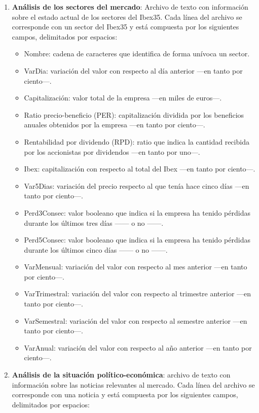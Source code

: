 \documentclass[a4paper, 11pt, titlepage]{article}
\begin{document}
\begin{enumerate}
        \item \textbf{Análisis de los sectores del mercado}: Archivo de texto con información sobre el estado actual de los sectores del Ibex35. Cada línea del archivo se corresponde con un sector del Ibex35 y está compuesta por los siguientes campos, delimitados por espacios:
        \begin{itemize}
            \item Nombre: cadena de caracteres que identifica de forma unívoca un sector.
            \item VarDia: variación del valor con respecto al día anterior ---en tanto por ciento---.
            \item Capitalización: valor total de la empresa ---en miles de euros---.
            \item Ratio precio-beneficio (PER): capitalización dividida por los beneficios anuales obtenidos por la empresa ---en tanto por ciento---.
            \item Rentabilidad por dividendo (RPD): ratio que indica la cantidad recibida por los accionistas por dividendos ---en tanto por uno---.
            \item Ibex: capitalización con respecto al total del Ibex ---en tanto por ciento---.
            \item Var5Dias: variación del precio respecto al que tenía hace cinco días ---en tanto por ciento---.
            \item Perd3Consec: valor booleano que indica si la empresa ha tenido pérdidas durante los últimos tres días ------ o no ------.
            \item Perd5Consec: valor booleano que indica si la empresa ha tenido pérdidas durante los últimos cinco días ------ o no ------.
            \item VarMensual: variación del valor con respecto al mes anterior ---en tanto por ciento---.
            \item VarTrimestral: variación del valor con respecto al trimestre anterior ---en tanto por ciento---.
            \item VarSemestral: variación del valor con respecto al semestre anterior ---en tanto por ciento---.
            \item VarAnual: variación del valor con respecto al año anterior ---en tanto por ciento---.
        \end{itemize}
        \item \textbf{Análisis de la situación político-económica}: archivo de texto con información sobre las noticias relevantes al mercado. Cada línea del archivo se corresponde con una noticia y está compuesta por los siguientes campos, delimitados por espacios:

\end{enumerate}
\end{document}
